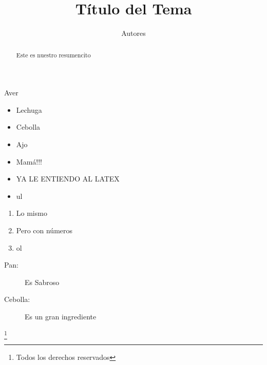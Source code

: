 \documentclass{article}
\title{Título del Tema}
\author{Autores}
\date{}
\begin{document}
    \maketitle

    \begin{abstract}
        Este es nuestro resumencito
    \end{abstract}
    Aver

    \begin{itemize}
        \item Lechuga
        \item Cebolla
        \item Ajo
        \item Mamá!!!
        \item YA LE ENTIENDO AL LATEX
        \item ul
    \end{itemize}

    \begin{enumerate}
        \item Lo mismo
        \item Pero con números
        \item ol
    \end{enumerate}

    \begin{description}
        \item[Pan:] Es Sabroso
        \item[Cebolla:] Es un gran ingrediente 
    \end{description}

    \footnote{Todos los derechos reservados}
\end{document}
